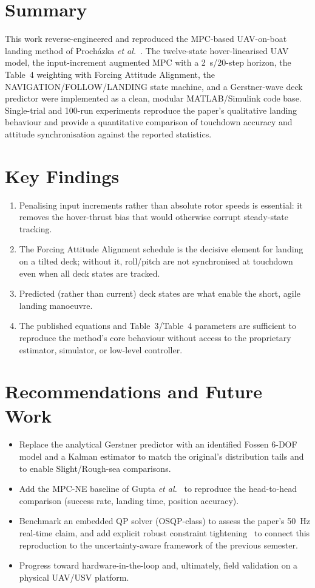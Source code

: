 \documentclass[12pt,a4paper]{report}
\begin{document}
\section{Summary}
This work reverse-engineered and reproduced the MPC-based UAV-on-boat landing method of Proch\'azka \emph{et al.}~\cite{prochazka2024}. The twelve-state hover-linearised UAV model, the input-increment augmented MPC with a \SI{2}{s}/20-step horizon, the Table~4 weighting with Forcing Attitude Alignment, the NAVIGATION/FOLLOW/LANDING state machine, and a Gerstner-wave deck predictor were implemented as a clean, modular MATLAB/Simulink code base. Single-trial and 100-run experiments reproduce the paper's qualitative landing behaviour and provide a quantitative comparison of touchdown accuracy and attitude synchronisation against the reported statistics.

\section{Key Findings}
\begin{enumerate}[itemsep=2pt]
    \item Penalising input increments rather than absolute rotor speeds is essential: it removes the hover-thrust bias that would otherwise corrupt steady-state tracking.
    \item The Forcing Attitude Alignment schedule is the decisive element for landing on a tilted deck; without it, roll/pitch are not synchronised at touchdown even when all deck states are tracked.
    \item Predicted (rather than current) deck states are what enable the short, agile landing manoeuvre.
    \item The published equations and Table~3/Table~4 parameters are sufficient to reproduce the method's core behaviour without access to the proprietary estimator, simulator, or low-level controller.
\end{enumerate}

\section{Recommendations and Future Work}
\begin{itemize}[itemsep=2pt]
    \item Replace the analytical Gerstner predictor with an identified Fossen 6-DOF model and a Kalman estimator to match the original's distribution tails and to enable Slight/Rough-sea comparisons.
    \item Add the MPC-NE baseline of Gupta \emph{et al.}~\cite{gupta2023} to reproduce the head-to-head comparison (success rate, landing time, position accuracy).
    \item Benchmark an embedded QP solver (OSQP-class) to assess the paper's \SI{50}{Hz} real-time claim, and add explicit robust constraint tightening~\cite{kohler2021} to connect this reproduction to the uncertainty-aware framework of the previous semester.
    \item Progress toward hardware-in-the-loop and, ultimately, field validation on a physical UAV/USV platform.
\end{itemize}
\end{document}
